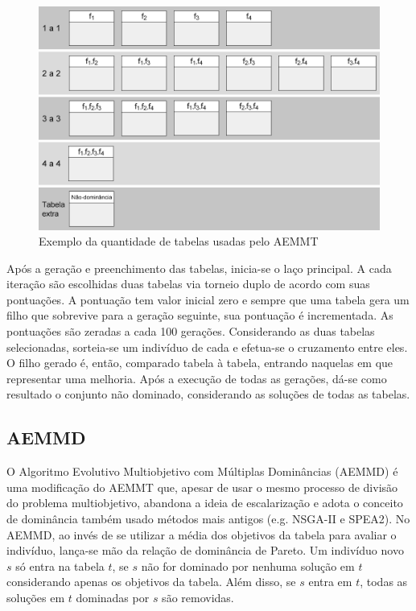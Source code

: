 \begin{figure}
	\centering
	\includegraphics[width=1\textwidth]{cap_otimizacao-multi/figs/aeemt-tabelas}
	\caption{\label{fig_aemmt_tabelas}Exemplo da quantidade de tabelas usadas pelo AEMMT}
\end{figure}

Após a geração e preenchimento das tabelas, inicia-se o laço principal. A cada iteração são escolhidas duas tabelas via torneio duplo de acordo com suas pontuações. A pontuação tem valor inicial zero e sempre que uma tabela gera um filho que sobrevive para a geração seguinte, sua pontuação é incrementada. As pontuações são zeradas a cada 100 gerações. Considerando as duas tabelas selecionadas, sorteia-se um indivíduo de cada e efetua-se o cruzamento entre eles. O filho gerado é, então, comparado tabela à tabela, entrando naquelas em que representar uma melhoria. Após a execução de todas as gerações, dá-se como resultado o conjunto não dominado, considerando as soluções de todas as tabelas.

\subsection{AEMMD}
\label{section_aemmd}

O Algoritmo Evolutivo Multiobjetivo com Múltiplas Dominâncias (AEMMD) \cite{Lafeta2016} é uma modificação do AEMMT que, apesar de usar o mesmo processo de divisão do problema multiobjetivo, abandona a ideia de escalarização e adota o conceito de dominância também usado métodos mais antigos (e.g. NSGA-II e SPEA2). No AEMMD, ao invés de se utilizar a média dos objetivos da tabela para avaliar o indivíduo, lança-se mão da relação de dominância de Pareto. Um indivíduo novo $s$ só entra na tabela $t$, se $s$ não for dominado por nenhuma solução em $t$ considerando apenas os objetivos da tabela. Além disso, se $s$ entra em $t$, todas as soluções em $t$ dominadas por $s$ são removidas.

